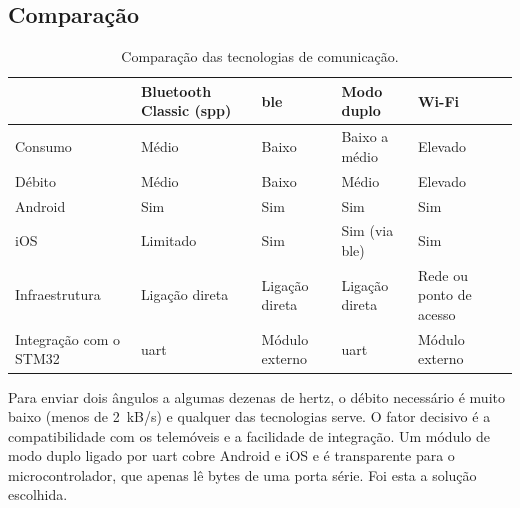 \subsection{Comparação}
\begin{table}[H]
\centering\small
\caption{Comparação das tecnologias de comunicação.}
\begin{tabularx}{\textwidth}{>{\raggedright\arraybackslash}p{2.8cm}YYYY}
\toprule
 & Bluetooth Classic (\acrshort{spp}) & \acrshort{ble} & Modo duplo & Wi-Fi\\\midrule
Consumo & Médio & Baixo & Baixo a médio & Elevado\\
Débito & Médio & Baixo & Médio & Elevado\\
Android & Sim & Sim & Sim & Sim\\
iOS & Limitado & Sim & Sim (via \acrshort{ble}) & Sim\\
Infraestrutura & Ligação direta & Ligação direta & Ligação direta & Rede ou ponto de acesso\\
Integração com o STM32 & \acrshort{uart} & Módulo externo & \acrshort{uart} & Módulo externo\\
\bottomrule
\end{tabularx}
\label{tab:comunicacao}
\end{table}

Para enviar dois ângulos a algumas dezenas de hertz, o débito necessário é muito baixo (menos de 2~kB/s) e qualquer das tecnologias serve. O fator decisivo é a compatibilidade com os telemóveis e a facilidade de integração. Um módulo de modo duplo ligado por \gls{uart} cobre Android e iOS e é transparente para o microcontrolador, que apenas lê bytes de uma porta série. Foi esta a solução escolhida.

